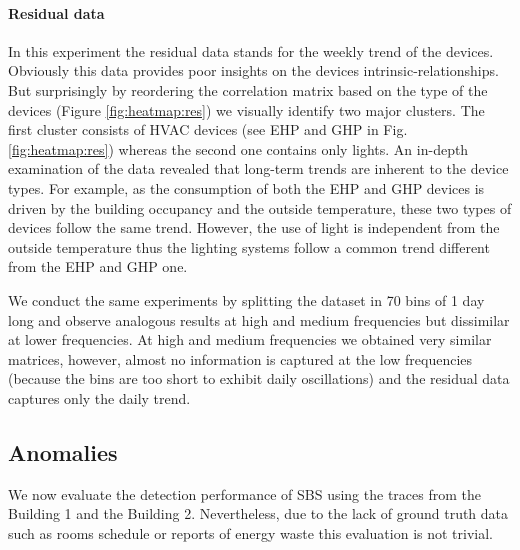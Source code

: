 \paragraph{Residual data}
In this experiment the residual data stands for the weekly trend of the devices.
Obviously this data provides poor insights on the devices intrinsic-relationships.
But surprisingly by reordering the correlation matrix based on the type of the devices (Figure \ref{fig:heatmap:res}) we visually identify two major clusters.
The first cluster consists of HVAC devices (see EHP and GHP in Fig. \ref{fig:heatmap:res}) whereas the second one contains only lights. 
An in-depth examination of the data revealed that long-term trends are inherent to the device types. 
For example, as the consumption of both the EHP and GHP devices is driven by the building occupancy and the outside temperature, these two types of devices follow the same trend. 
However, the use of light is independent from the outside temperature thus the lighting systems follow a common trend different from the EHP and GHP one.

We conduct the same experiments by splitting the dataset in 70 bins of 1 day long and observe analogous results at high and medium frequencies but dissimilar at lower frequencies.
At high and medium frequencies we obtained very similar matrices, however, almost no information is captured at the low frequencies (because the bins are too short to exhibit daily oscillations) and the residual data captures only the daily trend.


\subsection{Anomalies}
We now evaluate the detection performance of SBS using the traces from the Building 1 and the Building 2.
Nevertheless, due to the lack of ground truth data such as rooms schedule or reports of energy waste this evaluation is not trivial.

